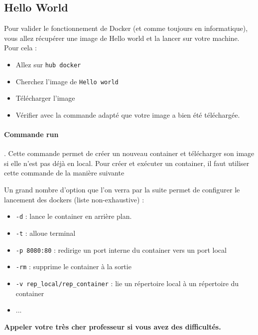 \documentclass[french, 12pt]{article}%
\newcommand{\itemE}{\item[$\bullet$]}
\begin{document}
\subsection{Hello World}

Pour valider le fonctionnement de Docker (et comme toujours en informatique), vous allez récupérer une image de Hello world et la lancer sur votre machine. Pour cela : 

\begin{itemize}
\itemE Allez sur \verb?hub docker?
\itemE Cherchez l'image de \verb?Hello world?
\itemE Télécharger l'image
\end{itemize}


\begin{itemize}
\itemE Vérifier avec la commande adapté que votre image a bien été téléchargée.
\end{itemize}


\paragraph{Commande run}. Cette commande permet de créer un nouveau container et télécharger son image si elle n’est pas déjà en local. Pour créer et exécuter un container, il faut utiliser cette commande de la manière suivante 


Un grand nombre d'option que l'on verra par la suite permet de configurer le lancement des dockers (liste non-exhaustive) :
\begin{itemize}
\itemE \verb?-d? : lance le container en arrière plan.
\itemE \verb?-t? : alloue terminal
\itemE \verb?-p 8080:80? : redirige un port interne du container vers un port
local
\itemE \verb?-rm? : supprime le container à la sortie
\itemE \verb?-v rep_local/rep_container? : lie un répertoire local à un répertoire du container
\itemE ...
\end{itemize}



\textbf{Appeler votre très cher professeur si vous avez des difficultés.}

\vspace{0.5cm}
\end{document}
